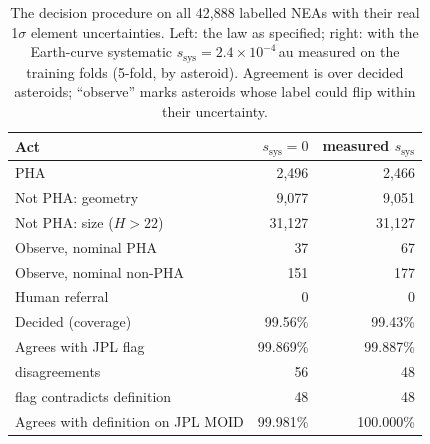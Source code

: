 \begin{table}[t]
\centering
\footnotesize
\caption{The decision procedure on all 42,888 labelled NEAs with their real 1$\sigma$ element uncertainties. Left: the law as specified; right: with the Earth-curve systematic $s_{\mathrm{sys}} = 2.4\times10^{-4}$\,au measured on the training folds (5-fold, by asteroid). Agreement is over decided asteroids; ``observe'' marks asteroids whose label could flip within their uncertainty.}
\label{tab:decision}
\setlength{\tabcolsep}{3pt}
\begin{tabular}{@{}lrr@{}}
\toprule
Act & $s_{\mathrm{sys}} = 0$ & measured $s_{\mathrm{sys}}$ \\
\midrule
PHA & 2,496 & 2,466 \\
Not PHA: geometry & 9,077 & 9,051 \\
Not PHA: size ($H > 22$) & 31,127 & 31,127 \\
Observe, nominal PHA & 37 & 67 \\
Observe, nominal non-PHA & 151 & 177 \\
Human referral & 0 & 0 \\
\midrule
Decided (coverage) & 99.56\% & 99.43\% \\
Agrees with JPL flag & 99.869\% & 99.887\% \\
\quad disagreements & 56 & 48 \\
\quad flag contradicts definition & 48 & 48 \\
Agrees with definition on JPL MOID & 99.981\% & 100.000\% \\
\bottomrule
\end{tabular}
\end{table}
